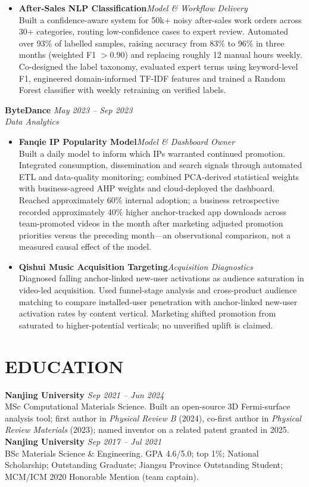 \documentclass[a4paper,10pt]{article}
\begin{document}
\begin{itemize}
\item \textbf{After-Sales NLP Classification}\hfill{\small\textit{Model \& Workflow Delivery}}\\[-1pt] Built a confidence-aware system for 50k+ noisy after-sales work orders across 30+ categories, routing low-confidence cases to expert review. Automated over 93\% of labelled samples, raising accuracy from 83\% to 96\% in three months (weighted F1 $>0.90$) and replacing roughly 12 manual hours weekly. Co-designed the label taxonomy, evaluated expert terms using keyword-level F1, engineered domain-informed TF-IDF features and trained a Random Forest classifier with weekly retraining on verified labels.
\end{itemize}

\textbf{ByteDance} \hfill \textit{May 2023 -- Sep 2023}\\
\textit{Data Analytics}
\begin{itemize}
\item \textbf{Fanqie IP Popularity Model}\hfill{\small\textit{Model \& Dashboard Owner}}\\[-1pt] Built a daily model to inform which IPs warranted continued promotion. Integrated consumption, dissemination and search signals through automated ETL and data-quality monitoring; combined PCA-derived statistical weights with business-agreed AHP weights and cloud-deployed the dashboard. Reached approximately 60\% internal adoption; a business retrospective recorded approximately 40\% higher anchor-tracked app downloads across team-promoted videos in the month after marketing adjusted promotion priorities versus the preceding month---an observational comparison, not a measured causal effect of the model.
\item \textbf{Qishui Music Acquisition Targeting}\hfill{\small\textit{Acquisition Diagnostics}}\\[-1pt] Diagnosed falling anchor-linked new-user activations as audience saturation in video-led acquisition. Used funnel-stage analysis and cross-product audience matching to compare installed-user penetration with anchor-linked new-user activation rates by content vertical. Marketing shifted promotion from saturated to higher-potential verticals; no unverified uplift is claimed.
\end{itemize}

\section{EDUCATION}
\textbf{Nanjing University} \hfill \textit{Sep 2021 -- Jun 2024}\\
MSc Computational Materials Science. Built an open-source 3D Fermi-surface analysis tool; first author in \textit{Physical Review B} (2024), co-first author in \textit{Physical Review Materials} (2023); named inventor on a related patent granted in 2025.\\[1pt]
\textbf{Nanjing University} \hfill \textit{Sep 2017 -- Jul 2021}\\
BSc Materials Science \& Engineering. GPA 4.6/5.0; top 1\%; National Scholarship; Outstanding Graduate; Jiangsu Province Outstanding Student; MCM/ICM 2020 Honorable Mention (team captain).
\end{document}
